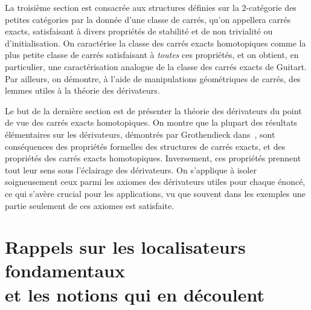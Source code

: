 \documentclass[francais]{smfart}
\theoremstyle{plain}
\theoremstyle{remark}
\theoremstyle{definition}
\numberwithin{equation}{thm}
\begin{document}
La troisième section est consacrée aux structures définies sur la $2${\nobreakdash}-catégorie des petites catégories par la donnée d'une classe de carrés, qu'on appellera carrés exacts, satisfaisant à divers propriétés de stabilité et de non trivialité ou \og d'initialisation\fg{}. On caractérise la classe des carrés exacts homotopiques comme la plus petite classe de carrés satisfaisant à \emph{toutes} ces propriétés, et on obtient, en particulier, une caractérisation analogue de la classe des carrés exacts de Guitart. Par ailleurs, on démontre, à l'aide de manipulations \og géométriques\fg{} de carrés, des lemmes utiles à la théorie des dérivateurs.
\smallbreak

Le but de la dernière section est de présenter la théorie des dérivateurs du point de vue des carrés exacts homotopiques. On montre que la plupart des résultats élémentaires sur les dérivateurs, démontrés par Grothendieck dans~\cite{Der}, sont conséquences des propriétés formelles des structures de carrés exacts, et des propriétés des carrés exacts homotopiques. Inversement, ces propriétés prennent tout leur sens sous l'éclairage des dérivateurs. On s'applique à isoler soigneusement ceux parmi les axiomes des dérivateurs utiles pour chaque énoncé, ce qui s'avère crucial pour les applications, vu que souvent dans les exemples une partie seulement de ces axiomes est satisfaite.

\section{Rappels sur les localisateurs fondamentaux\\ et les notions qui en découlent}
\end{document}
